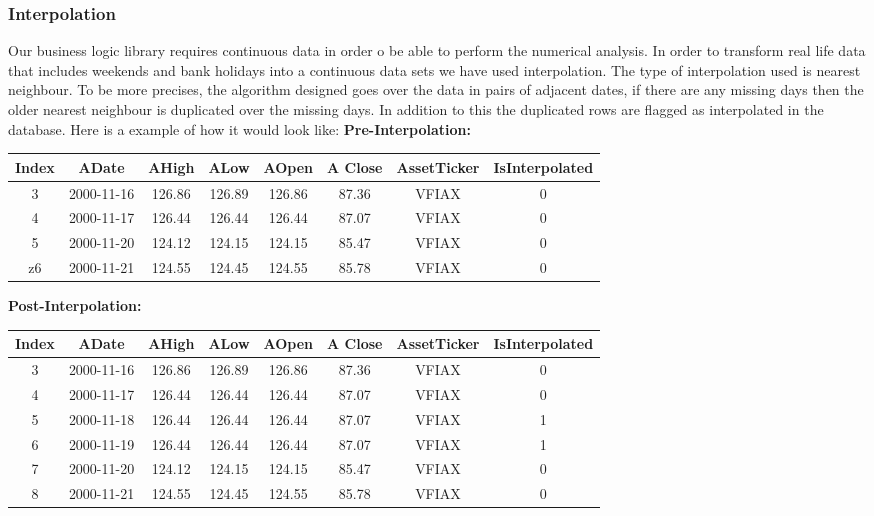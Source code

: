\documentclass[main.tex]{subfiles}
\begin{document}
\subsubsection{Interpolation}
Our business logic library requires continuous data in order o be able to perform the numerical analysis. In order to transform real life data that includes weekends and bank holidays into a continuous data sets we have used interpolation. The type of interpolation used is nearest neighbour. To be more precises, the algorithm designed goes over the data in pairs of adjacent dates, if there are any missing days then the older nearest neighbour is duplicated over the missing days. In addition to this the duplicated rows are flagged as interpolated in the database. Here is a example of how it would look like:
\textbf{\newline Pre-Interpolation: }
\begin{center}
 \begin{tabular}{||c c c c c c c c||} 
 \hline
 Index & ADate & AHigh & ALow & AOpen &A Close&AssetTicker&IsInterpolated\\ [0.5ex] 
 \hline\hline
 3&2000-11-16&126.86&126.89&126.86&87.36&VFIAX&0 \\ 
 \hline
 4&2000-11-17&126.44&126.44&126.44&87.07&VFIAX&0\\
 \hline
 5&2000-11-20&124.12&124.15&124.15&85.47&VFIAX&0\\ 
 \hline
 z6&2000-11-21&124.55&124.45&124.55&85.78&VFIAX&0\\
 \hline
\end{tabular}
\end{center}

\textbf{\newline Post-Interpolation: }
\begin{center}
 \begin{tabular}{||c c c c c c c c||} 
 \hline
 Index & ADate & AHigh & ALow & AOpen &A Close&AssetTicker&IsInterpolated\\ [0.5ex] 
 \hline\hline
 3&2000-11-16&126.86&126.89&126.86&87.36&VFIAX&0 \\ 
 \hline
 4&2000-11-17&126.44&126.44&126.44&87.07&VFIAX&0\\
 \hline
 5&2000-11-18&126.44&126.44&126.44&87.07&VFIAX&1
 \\
 \hline
 6&2000-11-19&126.44&126.44&126.44&87.07&VFIAX&1 \\
 \hline
7&2000-11-20&124.12&124.15&124.15&85.47&VFIAX&0\\ 
\hline
8&2000-11-21&124.55&124.45&124.55&85.78&VFIAX&0\\
 \hline
\end{tabular}
\end{center}
\end{document}
